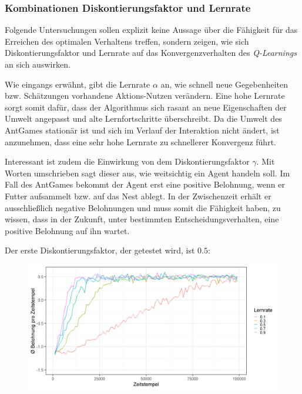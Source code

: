 \subsubsection*{Kombinationen Diskontierungsfaktor und Lernrate}
Folgende Untersuchungen sollen explizit keine Aussage über die Fähigkeit für das Erreichen des optimalen Verhaltens treffen, sondern zeigen, wie sich Diskontierungsfaktor und Lernrate auf das Konvergenzverhalten des \textit{Q-Learnings} an sich auswirken.
\par 
Wie eingangs erwähnt, gibt die Lernrate $\alpha$ an, wie schnell neue Gegebenheiten bzw. Schätzungen vorhandene Aktions-Nutzen verändern. Eine hohe Lernrate sorgt somit dafür, dass der Algorithmus sich rasant an neue Eigenschaften der Umwelt angepasst und alte Lernfortschritte überschreibt. Da die Umwelt des AntGames stationär ist und sich im Verlauf der Interaktion nicht ändert, ist anzunehmen, dass eine sehr hohe Lernrate zu schnellerer Konvergenz führt.
\par 
Interessant ist zudem die Einwirkung von dem Diskontierungsfaktor $\gamma$. Mit Worten umschrieben sagt dieser aus, wie \glqq weitsichtig\grqq{} ein Agent handeln soll. Im Fall des AntGames bekommt der Agent erst eine positive Belohnung, wenn er Futter aufsammelt bzw. auf das Nest ablegt. In der Zwischenzeit erhält er ausschließlich negative Belohnungen und muss somit die Fähigkeit haben, zu wissen, dass in der Zukunft, unter bestimmten Entscheidungsverhalten, eine positive Belohnung auf ihn wartet. 
\par 
Der erste Diskontierungsfaktor, der getestet wird, ist $0.5$:
\begin{figure}[H]
    \centering
    \includegraphics[width=\textwidth]{images/antGameAnalysis05DiscA}
    \label{fig:test1}
\end{figure}
